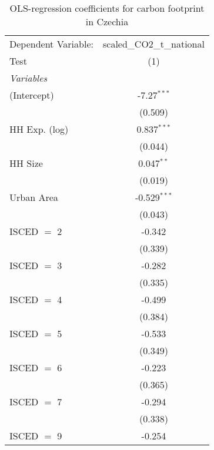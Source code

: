 
\begin{table}[htbp!]
   \centering
   \small
   \begin{adjustbox}{width = 1\textwidth, max height = 0.95\textheight, center}
      \begin{threeparttable}[b]
         \caption{\label{tab:OLS_2_CZE} OLS-regression coefficients for carbon footprint in Czechia}
         \begin{tabular}{lc}
            \tabularnewline \midrule \midrule
            Dependent Variable: & scaled\_CO2\_t\_national\\     
            Test                & (1)\\  
            \midrule
            \emph{Variables}\\
            (Intercept)         & -7.27$^{***}$\\   
                                & (0.509)\\   
            HH Exp. (log)       & 0.837$^{***}$\\   
                                & (0.044)\\   
            HH Size             & 0.047$^{**}$\\   
                                & (0.019)\\   
            Urban Area          & -0.529$^{***}$\\   
                                & (0.043)\\   
            ISCED $=$ 2         & -0.342\\   
                                & (0.339)\\   
            ISCED $=$ 3         & -0.282\\   
                                & (0.335)\\   
            ISCED $=$ 4         & -0.499\\   
                                & (0.384)\\   
            ISCED $=$ 5         & -0.533\\   
                                & (0.349)\\   
            ISCED $=$ 6         & -0.223\\   
                                & (0.365)\\   
            ISCED $=$ 7         & -0.294\\   
                                & (0.338)\\   
            ISCED $=$ 9         & -0.254\\   

\end{tabular}
\end{threeparttable}
\end{adjustbox}
\end{table}
